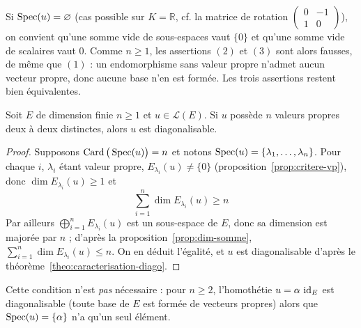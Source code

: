 \begin{remarque}
Si $\operatorname{Spec}(u)=\varnothing$ (cas possible sur $K=\mathbb{R}$, cf. la matrice de rotation $\begin{pmatrix} 0 & -1 \\ 1 & 0\end{pmatrix}$), on convient qu'une somme vide de sous-espaces vaut $\{0\}$ et qu'une somme vide de scalaires vaut $0$. Comme $n\geq 1$, les assertions $(2)$ et $(3)$ sont alors fausses, de même que $(1)$ : un endomorphisme sans valeur propre n'admet aucun vecteur propre, donc aucune base n'en est formée. Les trois assertions restent bien équivalentes.
\end{remarque}

\begin{coro}
\label{coro:n-vp-distinctes}
Soit $E$ de dimension finie $n\geq 1$ et $u\in\mathcal{L}(E)$. Si $u$ possède $n$ valeurs propres deux à deux distinctes, alors $u$ est diagonalisable.
\end{coro}

\begin{proof}
Supposons $\operatorname{Card}\big(\operatorname{Spec}(u)\big)=n$ et notons $\operatorname{Spec}(u)=\{\lambda_1,\dots,\lambda_n\}$. Pour chaque $i$, $\lambda_i$ étant valeur propre, $E_{\lambda_i}(u)\neq\{0\}$ (proposition~\ref{prop:critere-vp}), donc $\dim E_{\lambda_i}(u)\geq 1$ et
\[\sum_{i=1}^{n}\dim E_{\lambda_i}(u) \geq n\]
Par ailleurs $\bigoplus_{i=1}^{n}E_{\lambda_i}(u)$ est un sous-espace de $E$, donc sa dimension est majorée par $n$ ; d'après la proposition~\ref{prop:dim-somme}, $\sum_{i=1}^{n}\dim E_{\lambda_i}(u)\leq n$. On en déduit l'égalité, et $u$ est diagonalisable d'après le théorème~\ref{theo:caracterisation-diago}.
\end{proof}

\begin{remarque}
Cette condition n'est \emph{pas} nécessaire : pour $n\geq 2$, l'homothétie $u=\alpha\,\operatorname{id}_E$ est diagonalisable (toute base de $E$ est formée de vecteurs propres) alors que $\operatorname{Spec}(u)=\{\alpha\}$ n'a qu'un seul élément.
\end{remarque}

